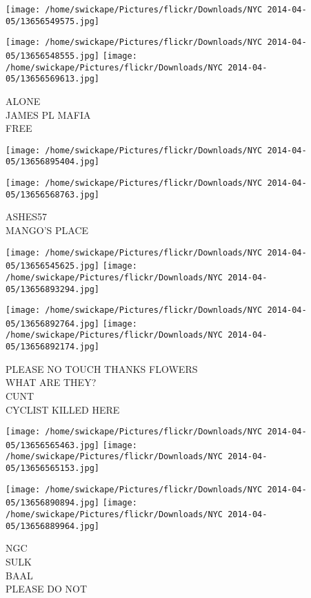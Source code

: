 \documentclass[10pt,letterpaper]{article}
\begin{document}
\texttt{[image: /home/swickape/Pictures/flickr/Downloads/NYC 2014-04-05/13656549575.jpg]}

\vspace{0.25in}
\texttt{[image: /home/swickape/Pictures/flickr/Downloads/NYC 2014-04-05/13656548555.jpg]}
\texttt{[image: /home/swickape/Pictures/flickr/Downloads/NYC 2014-04-05/13656569613.jpg]}

ALONE\\
JAMES PL MAFIA\\
FREE\\
\pagebreak

\texttt{[image: /home/swickape/Pictures/flickr/Downloads/NYC 2014-04-05/13656895404.jpg]}

\vspace{0.25in}
\texttt{[image: /home/swickape/Pictures/flickr/Downloads/NYC 2014-04-05/13656568763.jpg]}

ASHES57\\
MANGO'S PLACE\\
\pagebreak

\texttt{[image: /home/swickape/Pictures/flickr/Downloads/NYC 2014-04-05/13656545625.jpg]}
\texttt{[image: /home/swickape/Pictures/flickr/Downloads/NYC 2014-04-05/13656893294.jpg]}

\texttt{[image: /home/swickape/Pictures/flickr/Downloads/NYC 2014-04-05/13656892764.jpg]}
\texttt{[image: /home/swickape/Pictures/flickr/Downloads/NYC 2014-04-05/13656892174.jpg]}

PLEASE NO TOUCH THANKS FLOWERS\\
WHAT ARE THEY?\\
CUNT\\
CYCLIST KILLED HERE\\
\pagebreak

\texttt{[image: /home/swickape/Pictures/flickr/Downloads/NYC 2014-04-05/13656565463.jpg]}
\texttt{[image: /home/swickape/Pictures/flickr/Downloads/NYC 2014-04-05/13656565153.jpg]}

\texttt{[image: /home/swickape/Pictures/flickr/Downloads/NYC 2014-04-05/13656890894.jpg]}
\texttt{[image: /home/swickape/Pictures/flickr/Downloads/NYC 2014-04-05/13656889964.jpg]}

NGC\\
SULK\\
BAAL\\
PLEASE DO NOT\\
\pagebreak
\end{document}
